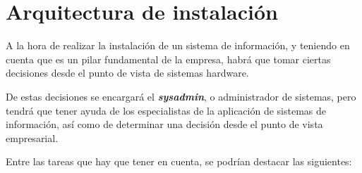 


\chapter{Arquitectura de instalación}
A la hora de realizar la instalación de un sistema de información, y teniendo en cuenta que es un pilar fundamental de la empresa, habrá que tomar ciertas decisiones desde el punto de vista de sistemas hardware.

De estas decisiones se encargará el \textbf{\textit{sysadmin}}, o administrador de sistemas, pero tendrá que tener ayuda de los especialistas de la aplicación de sistemas de información, así como de determinar una decisión desde el punto de vista empresarial.

Entre las tareas que hay que tener en cuenta, se podrían destacar las siguientes:

